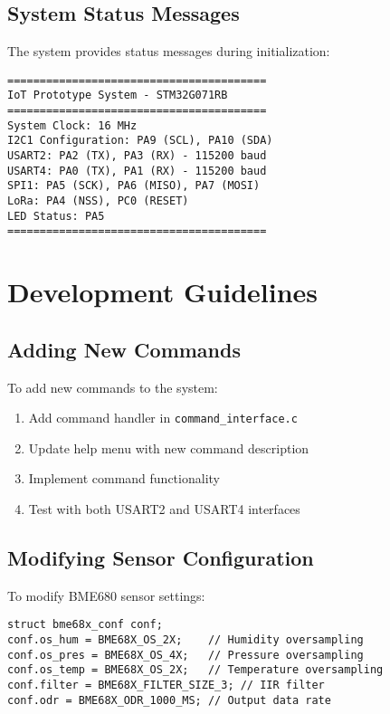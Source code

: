 \documentclass[11pt,a4paper]{article}
\begin{document}
\subsection{System Status Messages}
The system provides status messages during initialization:

\begin{lstlisting}[caption=System Initialization Messages]
========================================
IoT Prototype System - STM32G071RB
========================================
System Clock: 16 MHz
I2C1 Configuration: PA9 (SCL), PA10 (SDA)
USART2: PA2 (TX), PA3 (RX) - 115200 baud
USART4: PA0 (TX), PA1 (RX) - 115200 baud
SPI1: PA5 (SCK), PA6 (MISO), PA7 (MOSI)
LoRa: PA4 (NSS), PC0 (RESET)
LED Status: PA5
========================================
\end{lstlisting}

\section{Development Guidelines}

\subsection{Adding New Commands}
To add new commands to the system:

\begin{enumerate}
    \item Add command handler in \texttt{command\_interface.c}
    \item Update help menu with new command description
    \item Implement command functionality
    \item Test with both USART2 and USART4 interfaces
\end{enumerate}

\subsection{Modifying Sensor Configuration}
To modify BME680 sensor settings:

\begin{lstlisting}[caption=BME680 Configuration Example]
struct bme68x_conf conf;
conf.os_hum = BME68X_OS_2X;    // Humidity oversampling
conf.os_pres = BME68X_OS_4X;   // Pressure oversampling
conf.os_temp = BME68X_OS_2X;   // Temperature oversampling
conf.filter = BME68X_FILTER_SIZE_3; // IIR filter
conf.odr = BME68X_ODR_1000_MS; // Output data rate
\end{lstlisting}
\end{document}
